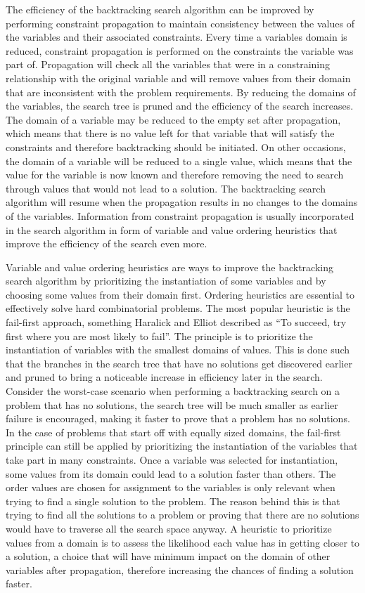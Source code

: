 \documentclass{l4proj}
\begin{document}
\noindent The efficiency of the backtracking search algorithm can be improved by performing constraint propagation to maintain consistency between the values of the variables and their associated constraints. Every time a variable\textquotesingle s domain is reduced, constraint propagation is performed on the constraints the variable was part of. Propagation will check all the variables that were in a constraining relationship with the original variable and will remove values from their domain that are inconsistent with the problem requirements. By reducing the domains of the variables, the search tree is pruned and the efficiency of the search increases. The domain of a variable may be reduced to the empty set after propagation, which means that there is no value left for that variable that will satisfy the constraints and therefore backtracking should be initiated. On other occasions, the domain of a variable will be reduced to a single value, which means that the value for the variable is now known and therefore removing the need to search through values that would not lead to a solution. The backtracking search algorithm will resume when the propagation results in no changes to the domains of the variables. Information from constraint propagation is usually incorporated in the search algorithm in form of variable and value ordering heuristics that improve the efficiency of the search even more.

\noindent Variable and value ordering heuristics are ways to improve the backtracking search algorithm by prioritizing the instantiation of some variables and by choosing some values from their domain first. Ordering heuristics are essential to effectively solve hard combinatorial problems. The most popular heuristic is the fail-first approach, something Haralick and Elliot \cite{haralick1980increasing} described as ``To succeed, try first where you are most likely to fail''. The principle is to prioritize the instantiation of variables with the smallest domains of values. This is done such that the branches in the search tree that have no solutions get discovered earlier and pruned to bring a noticeable increase in efficiency later in the search. Consider the worst-case scenario when performing a backtracking search on a problem that has no solutions, the search tree will be much smaller as earlier failure is encouraged, making it faster to prove that a problem has no solutions. In the case of problems that start off with equally sized domains, the fail-first principle can still be applied by prioritizing the instantiation of the variables that take part in many constraints. Once a variable was selected for instantiation, some values from its domain could lead to a solution faster than others. The order values are chosen for assignment to the variables is only relevant when trying to find a single solution to the problem. The reason behind this is that trying to find all the solutions to a problem or proving that there are no solutions would have to traverse all the search space anyway. A heuristic to prioritize values from a domain is to assess the likelihood each value has in getting closer to a solution, a choice that will have minimum impact on the domain of other variables after propagation, therefore increasing the chances of finding a solution faster. 
\end{document}
